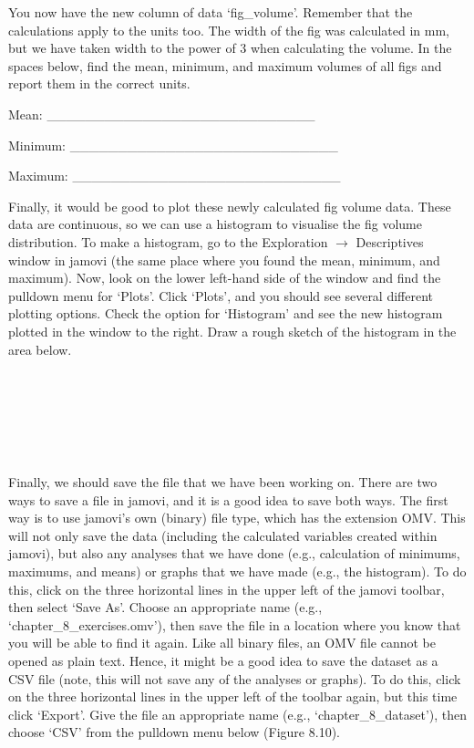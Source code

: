 \documentclass[
]{scrbook}
\begin{document}
You now have the new column of data `fig\_volume'.
Remember that the calculations apply to the units too.
The width of the fig was calculated in mm, but we have taken width to the power of 3 when calculating the volume.
In the spaces below, find the mean, minimum, and maximum volumes of all figs and report them in the correct units.

Mean: \_\_\_\_\_\_\_\_\_\_\_\_\_\_\_\_\_\_\_\_\_\_\_\_\_\_\_\_

Minimum: \_\_\_\_\_\_\_\_\_\_\_\_\_\_\_\_\_\_\_\_\_\_\_\_\_\_\_\_

Maximum: \_\_\_\_\_\_\_\_\_\_\_\_\_\_\_\_\_\_\_\_\_\_\_\_\_\_\_\_

Finally, it would be good to plot these newly calculated fig volume data.
These data are continuous, so we can use a histogram to visualise the fig volume distribution.
To make a histogram, go to the Exploration \(\to\) Descriptives window in jamovi (the same place where you found the mean, minimum, and maximum).
Now, look on the lower left-hand side of the window and find the pulldown menu for `Plots'.
Click `Plots', and you should see several different plotting options.
Check the option for `Histogram' and see the new histogram plotted in the window to the right.
Draw a rough sketch of the histogram in the area below.

\begin{verbatim}






\end{verbatim}

Finally, we should save the file that we have been working on.
There are two ways to save a file in jamovi, and it is a good idea to save both ways.
The first way is to use jamovi's own (binary) file type, which has the extension OMV.
This will not only save the data (including the calculated variables created within jamovi), but also any analyses that we have done (e.g., calculation of minimums, maximums, and means) or graphs that we have made (e.g., the histogram).
To do this, click on the three horizontal lines in the upper left of the jamovi toolbar, then select `Save As'.
Choose an appropriate name (e.g., `chapter\_8\_exercises.omv'), then save the file in a location where you know that you will be able to find it again.
Like all binary files, an OMV file cannot be opened as plain text.
Hence, it might be a good idea to save the dataset as a CSV file (note, this will not save any of the analyses or graphs).
To do this, click on the three horizontal lines in the upper left of the toolbar again, but this time click `Export'.
Give the file an appropriate name (e.g., `chapter\_8\_dataset'), then choose `CSV' from the pulldown menu below (Figure 8.10).
\end{document}
